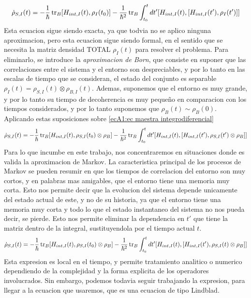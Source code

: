 \begin{equation}
    \dot \rho_{S,I}(t)=-\frac{1}{\hbar}\tr_B[H_{int,I}(t),\rho_I(t_0)]-\frac{1}{\hbar^2} \tr_B \int_{t_0}^{t}dt' [H_{int,I}(t),[H_{int,I}(t'),\rho_{I}(t')]]
\end{equation}
Esta ecuacion sigue siendo exacta, ya que todvia no se aplico ninguna aproximacion, pero esta ecuacion sigue siendo formal, en el sentido que se necesita la matriz densidad TOTAL $\rho_I(t)$ para resolver el problema. Para eliminarlo, se introduce la \textit{aproximacion de Born}, que consiste en suponer que las correlaciones entre el sistema y el entorno son despreciables, y por lo tanto en las escalas de tiempo que se consideran, el estado del conjunto es separable $\rho_I(t)=\rho_{S,I}(t)\otimes\rho_{B,I}(t)$. Ademas, suponemos que el entorno es muy grande, y por lo tanto su tiempo de decoherencia es muy pequeño en comparacion con los tiempos considerados, y por lo tanto suponemos que $\rho_B(t)\sim\rho_B(0)$. Aplicando estas suposiciones sobre \ref{ecA1:ec maestra integrodiferencial}
\begin{equation}
    \dot \rho_{S,I}(t)=-\frac{1}{\hbar}\tr_B[H_{int,I}(t),\rho_{S,I}(t_0)\otimes \rho_B]-\frac{1}{\hbar^2} \tr_B \int_{t_0}^{t}dt' [H_{int,I}(t),[H_{int,I}(t'),\rho_{S,I}(t')\otimes \rho_B]]
\end{equation}
Para lo que incumbe en este trabajo, nos concentraremos en situaciones donde es valida la aproximacion de Markov. La caracteristica principal de los procesos de Markov se pueden resumir en que los tiempos de correlacion del entorno son muy cortos, y en palabras mas amigables, que el entorno tiene una memoria muy corta. Esto nos permite decir que la evolucion del sistema depende unicamente del estado actual de este, y no de su historia, ya que el entorno tiene una memoria muy corta y todo lo que el estado instantaneo del sistema no nos pueda decir, se pierde. Esto nos permite eliminar la dependencia en $t'$ que tiene la matriz dentro de la integral, sustituyendola por el tiempo actual $t$.
\begin{equation}
    \dot \rho_{S,I}(t)=-\frac{1}{\hbar}\tr_B[H_{int,I}(t),\rho_{S,I}(t_0)\otimes \rho_B]-\frac{1}{\hbar^2} \tr_B \int_{t_0}^{t}dt' [H_{int,I}(t),[H_{int,I}(t'),\rho_{S,I}(t)\otimes \rho_B]]
    \label{ecA1:ec markov}
\end{equation}
Esta expresion es local en el tiempo, y permite tratamiento analitico o numerico dependiendo de la complejidad y la forma explicita de los operadores involucrados. Sin embargo, podemos todavia seguir trabajando la expresion, para llegar a la ecuacion que usaremos, que es una ecuacion de tipo Lindblad. 

